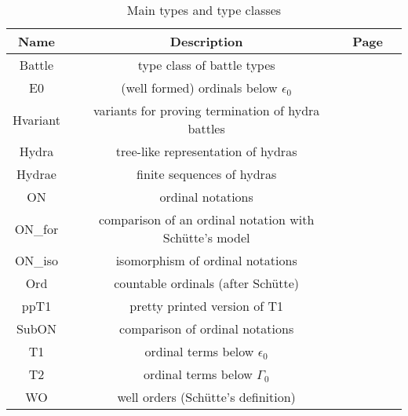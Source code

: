 \documentclass[a4paper]{book}
\begin{document}
\begin{table}[H]
  \centering
  \begin{threeparttable}
    \caption{Main types and type classes}
\begin{tabular}{|c|c|c|l|}
\hline
Name & Description& Page \\\hline
Battle & type class of battle types & \pageref{types:Battle} \\
E0 & (well formed) ordinals below $\epsilon_0$ & \pageref{types:E0}\\
Hvariant & variants for proving termination of hydra battles & \pageref{sect:hvariant-def} \\
Hydra & tree-like representation of hydras & \pageref{types:Hydra} \\
Hydrae & finite sequences of hydras & \pageref{types:Hydrae} \\
ON & ordinal  notations & \pageref{types:ON} \\
ON\_for & comparison of an ordinal notation with Schütte's model &  \pageref{types:ON-for}\\
ON\_iso & isomorphism of ordinal notations  & \pageref{types:ON-iso}\\

Ord & countable ordinals (after Schütte) & \pageref{types:Ord} \\
ppT1 & pretty printed version of T1 & \pageref{types:ppT1} \\
SubON & comparison of ordinal notations & \pageref{types:SubON} \\
T1 & ordinal terms below $\epsilon_0$ & \pageref{types:T1} \\
T2 & ordinal terms below $\Gamma_0$ & \pageref{types:T2} \\
WO & well orders (Schütte's definition) & \pageref{types:WO} \\
\hline
\end{tabular}
\end{threeparttable}
\end{table}
\end{document}
